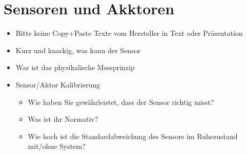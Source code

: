 \section{Sensoren und Akktoren}
\label{sec:Sensoren_Akktoren}

\begin{itemize}
    \item  Bitte keine Copy+Paste Texte vom Hersteller in Text oder Präsentation
    \item  Kurz und knackig, was kann der Sensor
    \item  Was ist das physikalische Messprinzip
    \item  Sensor/Aktor Kalibrierung
        \begin{itemize}
            \item Wie haben Sie gewährleistet, dass der Sensor richtig misst?
            \item Was ist ihr Normativ?
            \item Wie hoch ist die Standardabweichung des Sensors im Ruhezustand mit/ohne 
            System?
        \end{itemize}    
\end{itemize}